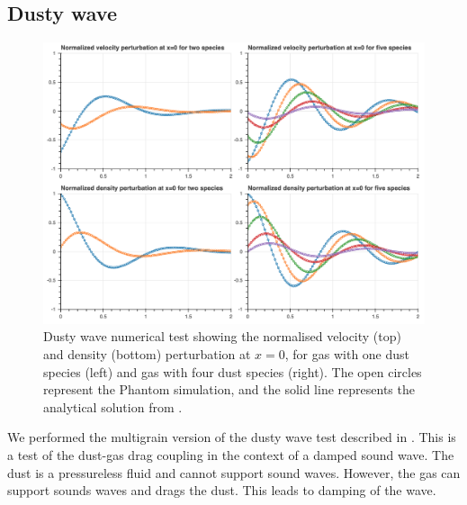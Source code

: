 \documentclass[fleqn,usenatbib]{mnras}
\begin{document}
\subsection{Dusty wave}

\begin{figure}
   \begin{center}
      \includegraphics[width=\textwidth]{figs/dustywave.png}
      \caption{Dusty wave numerical test showing the normalised velocity (top)
         and density (bottom) perturbation at \(x = 0\), for gas with one dust
         species (left) and gas with four dust species (right). The open circles
         represent the Phantom simulation, and the solid line represents the
         analytical solution from
         \citet{Benitez-Llambay2019ApJS..241...25B}.\label{fig:dustywave}}
   \end{center}
\end{figure}

We performed the multigrain version of the dusty wave test described in
\citet{Laibe2011MNRAS.418.1491L}. This is a test of the dust-gas drag coupling
in the context of a damped sound wave. The dust is a pressureless fluid and
cannot support sound waves. However, the gas can support sounds waves and drags
the dust. This leads to damping of the wave.
\end{document}
